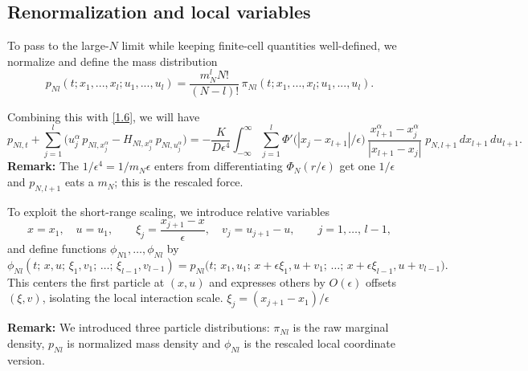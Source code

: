 \documentclass[11pt]{article}
\begin{document}
\subsection{Renormalization and local variables}
To pass to the large-$N$ limit while keeping finite-cell quantities well-defined, we normalize and define the mass distribution
\[\label{2.1}
p_{Nl}(t;x_1,...,x_l;u_1,...,u_l) 
= \frac{m_N^l N!}{ (N-l)!}\,\pi_{Nl}(t;x_1,...,x_l;u_1,...,u_l).
\tag{2.1}
\]

Combining this with \eqref{1.6}, we will have
\begin{equation*}\label{2.2}
p_{Nl,t}
+
\sum_{j=1}^l
\big(
u_j^\alpha\,p_{Nl,x_j^\alpha}
-
H_{Nl,x_j^\alpha}\,p_{Nl,u_j^\alpha}
\big)
=
-\frac{K}{D\epsilon^4}
\int_{-\infty}^{\infty}
\sum_{j=1}^l
\Phi'\!\big(|x_j-x_{l+1}|/\epsilon\big)\,
\frac{x_{l+1}^\alpha-x_j^\alpha}{|x_{l+1}-x_j|}
\;
p_{N,l+1}\,dx_{l+1}\,du_{l+1}.
\tag{2.2}
\end{equation*}
\textbf{Remark:} The $1/\epsilon^4=1/m_N\epsilon$ enters from differentiating $\Phi_N(r/\epsilon)$ get one $1/\epsilon$ and $p_{N,l+1}$ eats a $m_N$; this is the rescaled force.

To exploit the short-range scaling, we introduce relative variables
\begin{equation*}\tag{2.3}\label{2.3}
x=x_1,\quad u=u_1,\qquad
\xi_j=\frac{x_{j+1}-x}{\epsilon},\quad
v_j=u_{j+1}-u,\qquad j=1,\dots,\,l-1,
\end{equation*}
and define functions $\phi_{N1},\dots,\phi_{Nl}$ by
\[\tag{2.4}\label{2.4}
\phi_{Nl}(t;\,x,u;\,\xi_1,v_1;\,\dots;\,\xi_{l-1},v_{l-1})
=
p_{Nl}\big(t;\,x_1,u_1;\,x+\epsilon\xi_1,u+v_1;\,\dots;\,x+\epsilon\xi_{l-1},u+v_{l-1}\big).
\]
This centers the first particle at $(x,u)$ and expresses others by $O(\epsilon)$ offsets $(\xi,v)$, isolating the local interaction scale.
$\xi_j=(x_{j+1}-x_1)/\epsilon$

\textbf{Remark:} We introduced three particle distributions: $\pi_{Nl}$ is the raw marginal density, $p_{Nl}$ is normalized mass density and $\phi_{Nl}$ is the rescaled local coordinate version.
\end{document}
